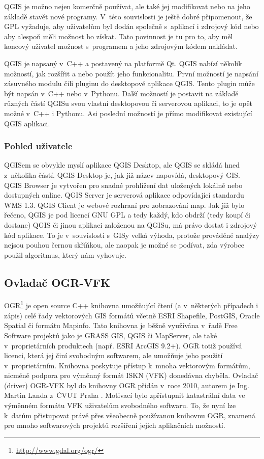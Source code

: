 \documentclass[a4paper,10pt]{article}
\begin{document}
QGIS je možno nejen komerčně používat, ale také jej modifikovat nebo na jeho základě stavět nové programy.
V~této souvislosti je ještě dobré připomenout, že GPL vyžaduje, aby uživatelům byl dodán společně s~aplikací i zdrojový kód nebo aby alespoň měli možnost ho získat.
Tato povinnost je tu pro to, aby měl koncový uživatel možnost s~programem a jeho zdrojovým kódem nakládat.

QGIS je napsaný v~C++ a postavený na platformě Qt.
QGIS nabízí několik možností, jak rozšířit a nebo použít jeho funkcionalitu.
První možností je napsání zásuvného modulu čili pluginu do desktopové aplikace QGIS.
Tento plugin může být napsán v~C++ nebo v~Pythonu.
Další možností je postavit na základě různých částí QGISu svou vlastní desktopovou či serverovou aplikaci, to je opět možné v~C++ i Pythonu.
Asi poslední možností je přímo modifikovat existující QGIS aplikaci.

\subsubsection{Pohled uživatele}

QGISem se obvykle myslí aplikace QGIS Desktop, ale QGIS se skládá hned z~několika částí.
QGIS Desktop je, jak již název napovídá, desktopový GIS.
QGIS Browser je vytvořen pro snadné prohlížení dat uložených lokálně nebo dostupných online.
QGIS Server je serverová aplikace odpovídající standardu WMS 1.3.
QGIS Client je webové rozhraní pro zobrazování map.
Jak již bylo řečeno, QGIS je pod licencí GNU GPL a tedy každý, kdo obdrží (tedy koupí či dostane) QGIS či jinou aplikaci založenou na QGISu, má právo dostat i zdrojový kód aplikace.
To je v~souvislosti s~GISy velká výhoda, protože prováděné analýzy nejsou pouhou černou skříňkou,
ale naopak je možné se podívat, zda výrobce použil algoritmus, který nám vyhovuje.

\subsection{Ovladač OGR-VFK}
OGR\footnote{\url{http://www.gdal.org/ogr/}} je open source C++ knihovna umožňující čtení (a v~některých případech i zápis)
celé řady vektorových GIS formátů včetně ESRI Shapefile, PostGIS, Oracle Spatial či formátu \mbox{Mapinfo}.
Tato knihovna je běžně využívána v~řadě Free Software projektů jako je GRASS GIS, QGIS či \mbox{MapServer}, ale také v~proprietárních produktech (např. ESRI ArcGIS 9.2+).
OGR totiž používá licenci, která jej činí svobodným softwarem, ale umožňuje jeho použití v~proprietárním.
Knihovna poskytuje přístup k~mnoha vektorovým formátům, nicméně podpora pro výměnný formát ISKN (VFK) donedávna chyběla.
Ovladač (driver) OGR-VFK byl do knihovny OGR přidán v~roce 2010, autorem je Ing. Martin Landa z~ČVUT Praha \cite{vfkDriver}.
Motivací bylo zpřístupnit katastrální data ve výměnném formátu VFK uživatelům svobodného softwaru.
To, že nyní lze k~datům přistupovat právě přes všeobecně používanou knihovnu OGR, znamená pro mnoho softwarových projektů rozšíření jejich aplikačních možností.
\end{document}
